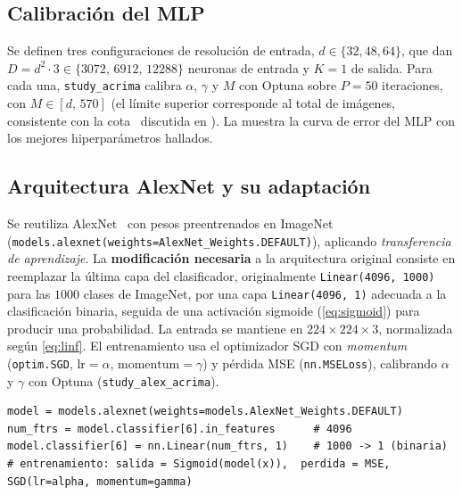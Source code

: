 \documentclass[11pt,a4paper]{article}
\begin{document}
\subsection{Calibración del MLP}

Se definen tres configuraciones de resolución de entrada,
$d\in\{32,48,64\}$, que dan $D=d^2\cdot 3\in\{3072,\,6912,\,12288\}$ neuronas de
entrada y $K=1$ de salida. Para cada una, \texttt{study\_acrima} calibra
$\alpha$, $\gamma$ y $M$ con Optuna sobre $P=50$ iteraciones, con
$M\in[d,\,570]$ (el límite superior corresponde al total de imágenes,
consistente con la cota~\cite{huang1998} discutida en ).
La  muestra la curva de error del MLP con los mejores
hiperparámetros hallados.


\subsection{Arquitectura AlexNet y su adaptación}

Se reutiliza AlexNet~\cite{krizhevsky2012alexnet} con pesos preentrenados en
ImageNet (\texttt{models.alexnet(weights=AlexNet\_Weights.DEFAULT)}),
aplicando \emph{transferencia de aprendizaje}. La \textbf{modificación necesaria}
a la arquitectura original consiste en reemplazar la última capa del
clasificador, originalmente \texttt{Linear(4096,\,1000)} para las $1000$ clases
de ImageNet, por una capa \texttt{Linear(4096,\,1)} adecuada a la clasificación
binaria, seguida de una activación sigmoide (\cref{eq:sigmoid}) para producir una
probabilidad. La entrada se mantiene en $224\times 224\times 3$, normalizada
según \cref{eq:linf}. El entrenamiento usa el optimizador SGD con \emph{momentum}
(\texttt{optim.SGD}, $\text{lr}=\alpha$, $\text{momentum}=\gamma$) y pérdida MSE
(\texttt{nn.MSELoss}), calibrando $\alpha$ y $\gamma$ con Optuna
(\texttt{study\_alex\_acrima}).

\begin{lstlisting}[caption={Adaptación de la cabeza de AlexNet para clasificación binaria.},label=lst:alex]
model = models.alexnet(weights=models.AlexNet_Weights.DEFAULT)
num_ftrs = model.classifier[6].in_features      # 4096
model.classifier[6] = nn.Linear(num_ftrs, 1)    # 1000 -> 1 (binaria)
# entrenamiento: salida = Sigmoid(model(x)),  perdida = MSE,  SGD(lr=alpha, momentum=gamma)
\end{lstlisting}
\end{document}
